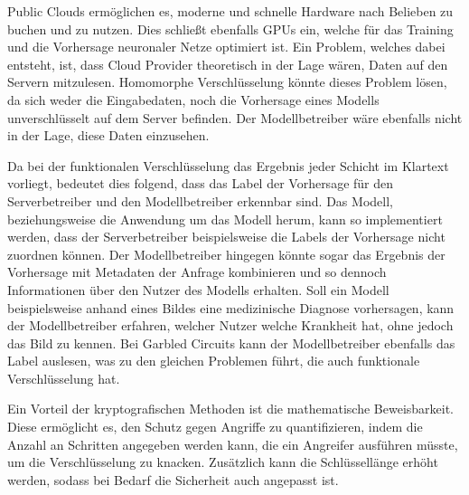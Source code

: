 Public Clouds ermöglichen es, moderne und schnelle Hardware nach Belieben zu buchen und zu nutzen.
Dies schließt ebenfalls GPUs ein, welche für das Training und die Vorhersage neuronaler Netze optimiert ist.
Ein Problem, welches dabei entsteht, ist, dass Cloud Provider theoretisch in der Lage wären, Daten auf den Servern mitzulesen.
Homomorphe Verschlüsselung könnte dieses Problem lösen, da sich weder die Eingabedaten, noch die Vorhersage eines Modells unverschlüsselt auf dem Server befinden.
Der Modellbetreiber wäre ebenfalls nicht in der Lage, diese Daten einzusehen.

Da bei der funktionalen Verschlüsselung das Ergebnis jeder Schicht im Klartext vorliegt, bedeutet dies folgend, dass das Label der Vorhersage für den Serverbetreiber und den Modellbetreiber erkennbar sind.
Das Modell, beziehungsweise die Anwendung um das Modell herum, kann so implementiert werden, dass der Serverbetreiber beispielsweise die Labels der Vorhersage nicht zuordnen können.
Der Modellbetreiber hingegen könnte sogar das Ergebnis der Vorhersage mit Metadaten der Anfrage kombinieren und so dennoch Informationen über den Nutzer des Modells erhalten. 
Soll ein Modell beispielsweise anhand eines Bildes eine medizinische Diagnose vorhersagen, kann der Modellbetreiber erfahren, welcher Nutzer welche Krankheit hat, ohne jedoch das Bild zu kennen.
Bei Garbled Circuits kann der Modellbetreiber ebenfalls das Label auslesen, was zu den gleichen Problemen führt, die auch funktionale Verschlüsselung hat.

Ein Vorteil der kryptografischen Methoden ist die mathematische Beweisbarkeit.
Diese ermöglicht es, den Schutz gegen Angriffe zu quantifizieren, indem die Anzahl an Schritten angegeben werden kann, die ein Angreifer ausführen müsste, um die Verschlüsselung zu knacken.
Zusätzlich kann die Schlüssellänge erhöht werden, sodass bei Bedarf die Sicherheit auch angepasst ist.